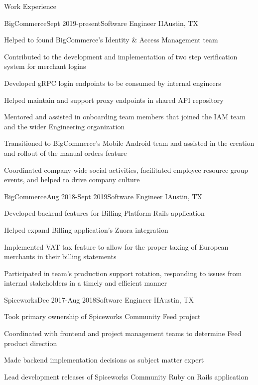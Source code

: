 \documentclass{resume} %
\begin{document}

\begin{rSection}{Work Experience}

\begin{rSubsection}{BigCommerce}{Sept 2019-present}{Software Engineer II}{Austin, TX}
\item Helped to found BigCommerce's Identity & Access Management team
\item Contributed to the development and implementation of two step verification system for merchant logins
\item Developed gRPC login endpoints to be consumed by internal engineers
\item Helped maintain and support proxy endpoints in shared API repository
\item Mentored and assisted in onboarding team members that joined the IAM team and the wider Engineering organization
\item Transitioned to BigCommerce's Mobile Android team and assisted in the creation and rollout of the manual orders feature
\item Coordinated company-wide social activities, facilitated employee resource group events, and helped to drive company culture
\end{rSubsection}


\begin{rSubsection}{BigCommerce}{Aug 2018-Sept 2019}{Software Engineer I}{Austin, TX}
\item Developed backend features for Billing Platform Rails application
\item Helped expand Billing application's Zuora integration
\item Implemented VAT tax feature to allow for the proper taxing of European merchants in their billing statements
\item Participated in team's production support rotation, responding to issues from internal stakeholders in a timely and efficient manner
\end{rSubsection}


\begin{rSubsection}{Spiceworks}{Dec 2017-Aug 2018}{Software Engineer II}{Austin, TX}
\item Took primary ownership of Spiceworks Community Feed project
\item Coordinated with frontend and project management teams to determine Feed product direction
\item Made backend implementation decisions as subject matter expert
\item Lead development releases of Spiceworks Community Ruby on Rails application
\end{rSubsection}


\end{rSection}
\end{document}

